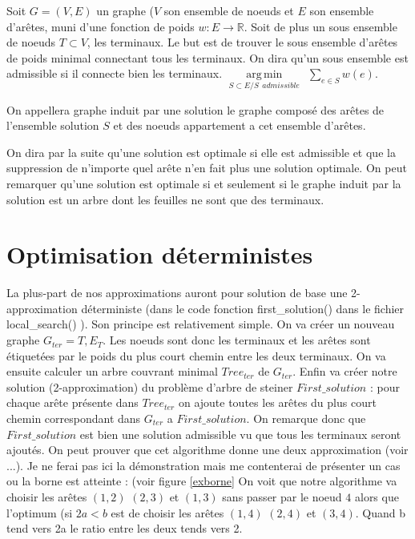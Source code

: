 \documentclass[10pt,a4paper]{article}
\DeclareMathOperator*{\argmin}{arg\,min}
\begin{document}
Soit $G = (V,E)$ un graphe ($V$ son ensemble de noeuds et $E$ son ensemble d'arêtes, muni d'une fonction de poids $w:E\rightarrow \mathbb{R}$. Soit de plus un sous ensemble de noeuds $T \subset V$, les terminaux. Le but est de trouver le sous ensemble d'arêtes de poids minimal connectant tous les terminaux. On dira qu'un sous ensemble est admissible si il connecte bien les terminaux.  $\argmin\limits_{S\subset E / S ~~admissible} ~~ \sum\limits_{e\in S} w(e) $. 

On appellera graphe induit par une solution le graphe composé des arêtes de l'ensemble solution $S$ et des noeuds appartement a cet ensemble d'arêtes. 

On dira par la suite qu'une solution est optimale si elle est admissible et que la suppression de n'importe quel arête n'en fait plus une solution optimale. On peut remarquer qu'une solution est optimale si et seulement si le graphe induit par la solution est un arbre dont les feuilles ne sont que des terminaux. 

\section{Optimisation déterministes}

La plus-part de nos approximations auront pour solution de base une 2-approximation déterministe (dans le code fonction first\_solution() dans le fichier local\_search() ).
Son principe est relativement simple. On va créer un nouveau graphe $G_{ter} = {T, E_T}$. Les noeuds sont donc les terminaux et les arêtes sont étiquetées par le poids du plus court chemin entre les deux terminaux. On va ensuite calculer un arbre couvrant minimal $Tree_{ter}$ de $G_{ter}$. Enfin va créer notre solution (2-approximation) du problème d'arbre de steiner $First\_solution$ :  pour chaque arête présente dans $Tree_{ter}$ on ajoute toutes les arêtes du plus court chemin correspondant dans $G_{ter} $ a $First\_solution$. On remarque donc que $First\_solution$ est bien une solution admissible vu que tous les terminaux seront ajoutés. On peut prouver que cet algorithme donne une deux approximation (voir ...). Je ne ferai pas ici la démonstration mais me contenterai de présenter un cas ou la borne est atteinte : (voir figure \ref{exborne} On voit que notre algorithme va choisir les arêtes $(1,2)$ $(2,3)$ et $(1,3)$ sans passer par le noeud $4$ alors que l'optimum (si $2a<b$ est de choisir les arêtes $(1,4)$ $(2,4)$ et $(3,4)$. Quand b tend vers 2a le ratio entre les deux tends vers 2.
\end{document}
